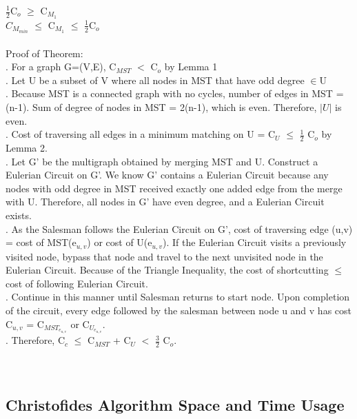 \documentclass[12pt, oneside]{article}   	%
\begin{document}
\indent\indent\indent $\frac{1}{2}$C$_o$ $\geq$ C$_{M_1}$\\
\indent\indent\indent $C_{M_{min}}$ $\leq$ C$_{M_1}$ $\leq$ $\frac{1}{2}$C$_o$ \\\\
\indent\indent Proof of Theorem:\\ 
\indent\indent{}. For a graph G=(V,E), C$_{MST}$ $<$ C$_o$ by Lemma 1\\
\indent\indent{}.  Let U be a subset of V where all nodes in MST that have odd \newline degree $\in$U\\
\indent\indent{}.  Because MST is a connected graph with no cycles, number of edges in MST = (n-1).  Sum of degree of nodes in MST = 2(n-1), which is even.  Therefore, $|U|$ is even.\\
\indent\indent{}.  Cost of traversing all edges in a minimum matching on U = C$_U$ $\leq$ $\frac{1}{2}$ C$_o$ by Lemma 2.\\
\indent\indent{}.  Let G' be the multigraph obtained by merging MST and U.  Construct a Eulerian Circuit on G'. We know G' contains a Eulerian Circuit because any nodes with odd degree in MST received exactly one added edge from the merge with U.  Therefore, all nodes in G' have even degree, and a Eulerian Circuit exists.\\
\indent\indent{}.  As the Salesman follows the Eulerian Circuit on G', cost of traversing edge (u,v) = cost of MST(e$_{u,v}$) or cost of U(e$_{u,v}$).  If the Eulerian Circuit visits a previously visited node, bypass that node and travel to the next unvisited node in the Eulerian Circuit.  Because of the Triangle Inequality, the cost of shortcutting $\leq$ cost of following Eulerian Circuit.\\
\indent\indent{}.  Continue in this manner until Salesman returns to start node.  Upon completion of the circuit, every edge followed by the salesman between node u and v has cost C$_{u,v}$ = C$_{MST_{e_{u,v}}}$ or C$_{U_{e_{u,v}}}$.\\
\indent\indent{}.  Therefore, C$_{c}$ $\leq$ C$_{MST}$ + C$_U$ $<$ $\frac{3}{2}$ C$_o$.\\\\\\
\subsection{Christofides Algorithm Space and Time Usage}
\end{document}
